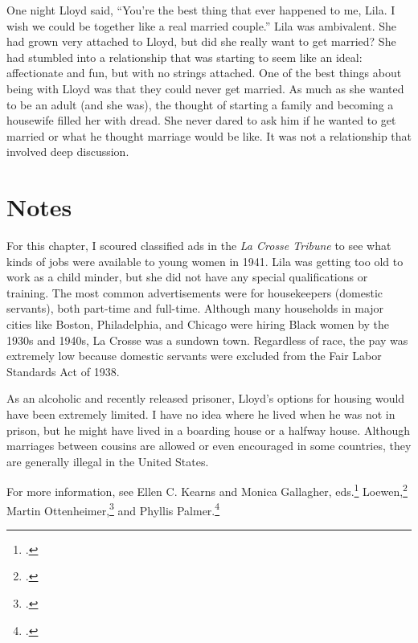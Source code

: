 \documentclass[
  american,
  letterpaper,
]{book}
\begin{document}
One night Lloyd said, ``You're the best thing that ever happened to me,
Lila. I wish we could be together like a real married couple.'' Lila was
ambivalent. She had grown very attached to Lloyd, but did she really
want to get married? She had stumbled into a relationship that was
starting to seem like an ideal: affectionate and fun, but with no
strings attached. One of the best things about being with Lloyd was that
they could never get married. As much as she wanted to be an adult (and
she was), the thought of starting a family and becoming a housewife
filled her with dread. She never dared to ask him if he wanted to get
married or what he thought marriage would be like. It was not a
relationship that involved deep discussion.

\section{Notes}\label{notes-24}

For this chapter, I scoured classified ads in the \emph{La Crosse
Tribune} to see what kinds of jobs were available to young women in
1941. Lila was getting too old to work as a child minder, but she did
not have any special qualifications or training. The most common
advertisements were for housekeepers (domestic servants), both part-time
and full-time. Although many households in major cities like Boston,
Philadelphia, and Chicago were hiring Black women by the 1930s and
1940s, La Crosse was a sundown town. Regardless of race, the pay was
extremely low because domestic servants were excluded from the Fair
Labor Standards Act of 1938.

As an alcoholic and recently released prisoner, Lloyd's options for
housing would have been extremely limited. I have no idea where he lived
when he was not in prison, but he might have lived in a boarding house
or a halfway house. Although marriages between cousins are allowed or
even encouraged in some countries, they are generally illegal in the
United States.

For more information, see Ellen C. Kearns and Monica Gallagher,
eds.\footnote{.}
Loewen,\footnote{.}
Martin Ottenheimer,\footnote{.} and Phyllis Palmer.\footnote{.}
\end{document}
